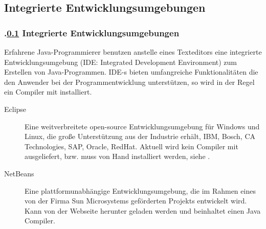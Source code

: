 \def\stitle{Integrierte Entwicklungsumgebungen}%
\subsection{\stitle}\label{S:IDE}
\begin{frame}[t]%
  \frametitle{\kap.\ref{S:IDE} \stitle}%
\medskip

{\color{red}Erfahrene Java-Programmierer} benutzen anstelle eines Texteditors eine integrierte Entwicklungsumgebung (IDE: Integrated Development Environment) zum Erstellen von Java-Programmen.
IDE-s bieten umfangreiche Funktionalit\"aten die den Anwender bei der Programmentwicklung unterst\"utzen, so wird in der Regel ein Compiler mit installiert.
\medskip

\begin{description}
  \item[Eclipse] Eine weitverbreitete open-source Entwicklungsumgebung f\"ur Windows und Linux, die gro\ss e Unterst\"utzung aus der Industrie erh\"alt, IBM, Bosch, CA Technologies, SAP, Oracle, RedHat.
    Aktuell wird kein Compiler mit ausgeliefert, bzw. muss von Hand installiert werden, siehe .
  \item[NetBeans] Eine plattformunabh\"angige Entwicklungsumgebung, die im Rahmen eines von der Firma Sun Microsystems gef\"orderten Projekts entwickelt wird.
    Kann von der Webseite  herunter geladen werden und beinhaltet einen Java Compiler.
\end{description}
\end{frame}
